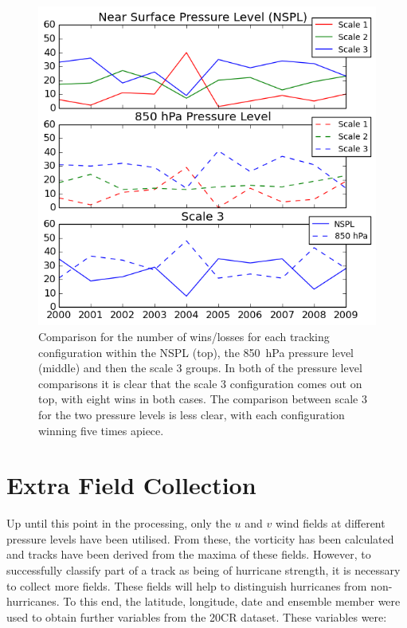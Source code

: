\documentclass[pdftex,12pt,a4paper]{report}
\begin{document}
\begin{figure}[hbp]
    \centering
    \includegraphics[width=\linewidth]{figures/tracking_wins_losses}
    \caption{Comparison for the number of wins/losses for each tracking configuration within the
        NSPL (top), the \SI{850}{hPa} pressure level (middle) and then the scale 3 groups. In both
        of the pressure level comparisons it is clear that the scale 3 configuration comes out on top,
        with eight wins in both cases. The comparison between scale 3 for the two pressure levels is less
        clear, with each configuration winning five times apiece.}
    \label{fig:tracking_wins_losses}
\end{figure}

\newpage
\section{Extra Field Collection}
\label{sec:extra_field_collection}

Up until this point in the processing, only the $u$ and $v$ wind fields at different pressure levels
have been utilised. From these, the vorticity has been calculated and tracks have been derived from
the maxima of these fields. However, to successfully classify part of a track as being of hurricane
strength, it is necessary to collect more fields. These fields will help to distinguish hurricanes
from non-hurricanes. To this end, the latitude, longitude, date and ensemble member were used to
obtain further variables from the 20CR dataset. These variables were:
\end{document}
